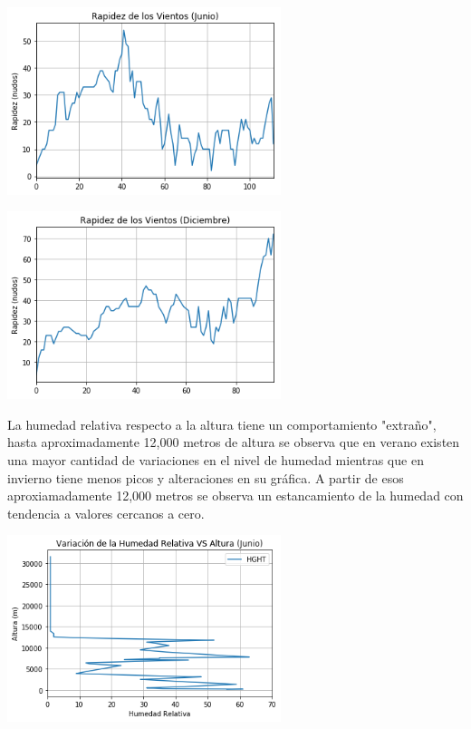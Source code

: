 \documentclass{article} %
\begin{document}
\begin{center}
 	\includegraphics[width=8cm]{7.png}
 \end{center}
 
 
 \begin{center}
 	\includegraphics[width=8cm]{8.png}
 \end{center}
 
 La humedad relativa respecto a la altura tiene un comportamiento "extraño", hasta aproximadamente 12,000 metros de altura se observa que en verano existen una mayor cantidad de variaciones en el nivel de humedad mientras que en invierno tiene menos picos y alteraciones en su gráfica. A partir de esos aproxiamadamente 12,000 metros se observa un estancamiento de la humedad con tendencia a valores cercanos a cero. 
 
 \begin{center}
 	\includegraphics[width=8cm]{9.png}
 \end{center}
 
\end{document}
